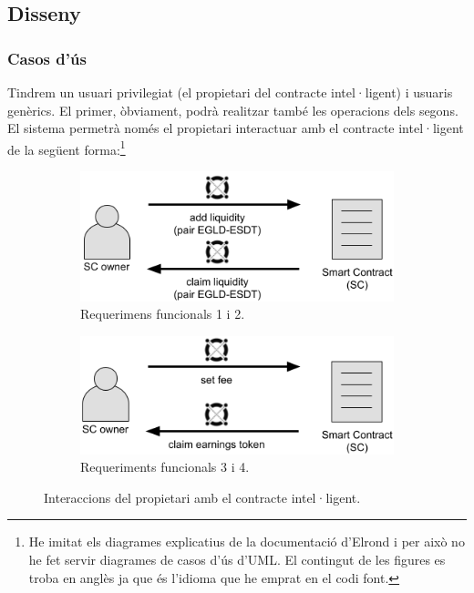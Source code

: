 \documentclass[11pt,a4paper]{article}
\begin{document}
\subsection{Disseny}

\subsubsection{Casos d'ús}\label{subsub:casosdus}

Tindrem un usuari privilegiat (el propietari del contracte intel·ligent) i usuaris genèrics. El primer, òbviament, podrà realitzar també les operacions dels segons. El sistema permetrà només el propietari interactuar amb el contracte intel·ligent de la següent forma:{\footnote{He imitat els diagrames explicatius de la documentació d'Elrond \cite{elrond2022} i per això no he fet servir diagrames de casos d'ús d'UML. El contingut de les figures es troba en anglès ja que és l'idioma que he emprat en el codi font.}}

\begin{figure}[!htb]
\begin{subfigure}[b]{0.485\textwidth}
  \includegraphics[width=\linewidth]{cu_add_claim_liquidity.png}
  \caption{Requerimens funcionals 1 i 2.}\label{fig:addclaimliq}
\end{subfigure}\hfill
\begin{subfigure}[b]{0.49\textwidth}
  \includegraphics[width=\linewidth]{cu_set_fee_claim_earnings.png}
  \caption{Requeriments funcionals 3 i 4.}\label{fig:setfeeclaim}
\end{subfigure}\hfill
\caption{Interaccions del propietari amb el contracte intel·ligent.}
\end{figure}
\end{document}
